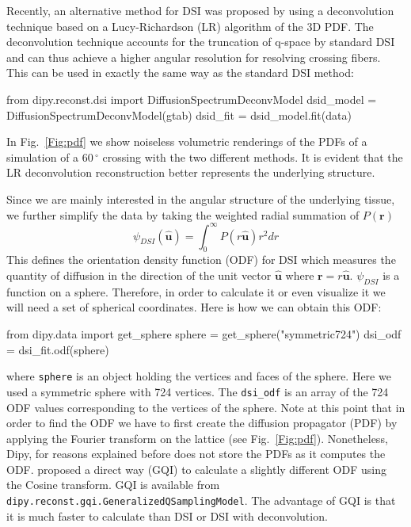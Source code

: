 \documentclass{bioinfo}
\begin{document}
Recently, an alternative method for DSI was proposed by
\citet{canales-rodriguez-etal:10} using a deconvolution technique
based on a Lucy-Richardson (LR) algorithm of the 3D PDF. The
deconvolution technique accounts for the truncation of q-space by
standard DSI and can thus achieve a higher angular resolution for
resolving crossing fibers. This can be used in exactly the same way as
the standard DSI method:
\begin{python}
from dipy.reconst.dsi import
                      DiffusionSpectrumDeconvModel
dsid_model = DiffusionSpectrumDeconvModel(gtab)
dsid_fit = dsid_model.fit(data)
\end{python}

In Fig.~\ref{Fig:pdf} we show noiseless volumetric renderings of the PDFs of
a simulation of a $60\,^{\circ}$ crossing with the two different methods. It
is evident that the LR deconvolution reconstruction better represents the
underlying structure.

Since we are mainly interested in the angular structure of the underlying
tissue, we further simplify the data by taking the weighted radial summation of
$P(\mathbf{r})$
\begin{equation}
\psi_{DSI}(\hat{\mathbf{u}})=\int_{0}^{\infty}P(r\hat{\mathbf{u}})r^{2}dr\label{eq:ODF_DSI}
\end{equation}
\noindent This defines the orientation density function (ODF) for DSI which
measures the quantity of diffusion in the direction of the unit vector
$\mathbf{\hat{u}}$ where $\mathbf{r=}r\hat{\mathbf{u}}$. $\psi_{DSI}$ is a
function on a sphere. Therefore, in order to calculate it or even visualize it
we will need a set of spherical coordinates. Here is how we can obtain this ODF:
\begin{python}
from dipy.data import get_sphere
sphere = get_sphere("symmetric724")
dsi_odf = dsi_fit.odf(sphere)
\end{python}
where \texttt{sphere} is an object holding the vertices and faces of the
sphere. Here we used a symmetric sphere with 724 vertices. The
\texttt{dsi\_odf} is an array of the 724 ODF values corresponding to the
vertices of the sphere. Note at this point that in order to find the ODF we
have to first create the diffusion propagator (PDF) by applying the Fourier transform
on the lattice (see Fig.~\ref{Fig:pdf}). Nonetheless, Dipy, for reasons explained before does not store
the PDFs as it computes the ODF. \cite{yeh-etal:10} proposed a direct way (GQI) to
calculate a slightly different ODF using the Cosine transform. GQI is
available from \texttt{dipy.reconst.gqi.GeneralizedQSamplingModel}. The
advantage of GQI is that it is much faster to calculate than DSI or DSI with
deconvolution.
\end{document}
